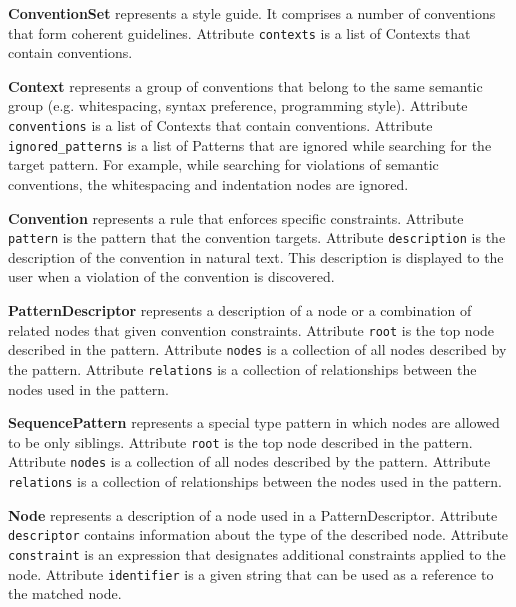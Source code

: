 \documentclass[parskip=full]{uvamscse}
\begin{document}
\begin{description}

\item\textbf{ConventionSet} represents a style guide. It comprises a number of conventions that form coherent guidelines. Attribute \texttt{contexts} is a list of Contexts that contain conventions.


\item\textbf{Context} represents a group of conventions that belong to the same semantic group (e.g. whitespacing, syntax preference, programming style). Attribute \texttt{conventions} is a list of Contexts that contain conventions. Attribute \texttt{ignored\_patterns} is a list of Patterns that are ignored while searching for the target pattern. For example, while searching for violations of semantic conventions, the whitespacing and indentation nodes are ignored.


\item\textbf{Convention} represents a rule that enforces specific constraints. Attribute \texttt{pattern} is the pattern that the convention targets. Attribute \texttt{description} is the description of the convention in natural text. This description is displayed to the user when a violation of the convention is discovered.


\item\textbf{PatternDescriptor} represents a description of a node or a combination of related nodes that given convention constraints. Attribute \texttt{root} is the top node described in the pattern. Attribute \texttt{nodes} is a collection of all nodes described by the pattern. Attribute \texttt{relations} is a collection of relationships between the nodes used in the pattern.


\item\textbf{SequencePattern} represents a special type pattern in which nodes are allowed to be only siblings. Attribute \texttt{root} is the top node described in the pattern. Attribute \texttt{nodes} is a collection of all nodes described by the pattern. Attribute \texttt{relations} is a collection of relationships between the nodes used in the pattern.


\item\textbf{Node} represents a description of a node used in a PatternDescriptor. Attribute
\texttt{descriptor} contains information about the type of the described node. Attribute
\texttt{constraint} is an expression that designates additional constraints applied to the node.
Attribute \texttt{identifier} is a given string that can be used as a reference to the matched node.



\end{description}
\end{document}
